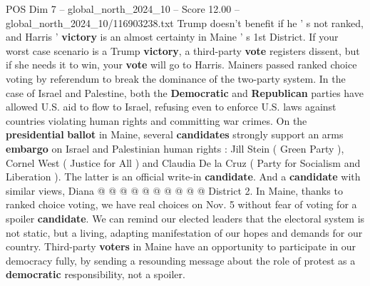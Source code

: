 \begin{textsample}{POS Dim 7 – global\_north\_2024\_10 – Score 12.00 – global\_north\_2024\_10/116903238.txt}
Trump doesn't benefit if he ' s not ranked, and Harris ' \textbf{victory} is an almost certainty in Maine ' s 1st District.
If your worst case scenario is a Trump \textbf{victory}, a third-party \textbf{vote} registers dissent, but if she needs it to win, your \textbf{vote} will go to Harris.
Mainers passed ranked choice voting by referendum to break the dominance of the two-party system.
In the case of Israel and Palestine, both the \textbf{Democratic} and \textbf{Republican} parties have allowed U.S. aid to flow to Israel, refusing even to enforce U.S. laws against countries violating human rights and committing war crimes.
On the \textbf{presidential} \textbf{ballot} in Maine, several \textbf{candidates} strongly support an arms \textbf{embargo} on Israel and Palestinian human rights : Jill Stein ( Green Party ), Cornel West ( Justice for All ) and Claudia De la Cruz ( Party for Socialism and Liberation ).
The latter is an official write-in \textbf{candidate}.
And a \textbf{candidate} with similar views, Diana @ @ @ @ @ @ @ @ @ @ District 2.
In Maine, thanks to ranked choice voting, we have real choices on Nov. 5 without fear of voting for a spoiler \textbf{candidate}.
We can remind our elected leaders that the electoral system is not static, but a living, adapting manifestation of our hopes and demands for our country.
Third-party \textbf{voters} in Maine have an opportunity to participate in our democracy fully, by sending a resounding message about the role of protest as a \textbf{democratic} responsibility, not a spoiler.

\end{textsample}
